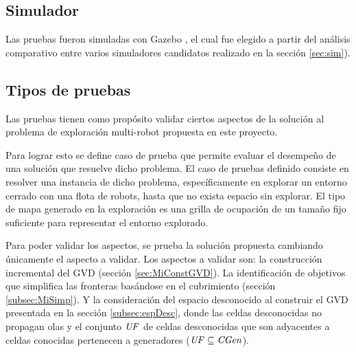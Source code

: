 

\subsection{Simulador}
Las pruebas fueron simuladas con Gazebo \cite{gazebo}, el cual fue elegido a
partir del análisis comparativo entre varios simuladores candidatos realizado
en la sección \ref{sec:sim}). 

\subsection{Tipos de pruebas}
Las pruebas tienen como propósito validar ciertos aspectos de la
solución al problema de exploración multi-robot propuesta en este proyecto.
 
Para lograr esto se define caso de prueba que permite evaluar el desempeño de
una solución que resuelve dicho problema. El caso de pruebas definido consiste
en resolver una instancia de dicho problema, específicamente en explorar un
entorno cerrado con una flota de robots, hasta que no exista espacio sin
explorar. El tipo de mapa generado en la exploración es una grilla de ocupación
de un tamaño fijo suficiente para representar el entorno explorado.

Para poder validar los aspectos, se prueba la solución propuesta cambiando
únicamente el aspecto a validar. Los aspectos a validar son: la construcción
incremental del GVD (sección \ref{sec:MiConstGVD}). La identificación de
objetivos que simplifica las fronteras basándose en el cubrimiento (sección
\ref{subsec:MiSimp}). Y la consideración del espacio desconocido al construir
el GVD presentada en la sección \ref{subsec:espDesc}, donde las celdas
desconocidas no propagan olas y el conjunto $\mathit{UF}$ de celdas desconocidas
que son adyacentes a celdas conocidas pertenecen a generadores ($\mathit{UF}
\subseteq \mathit{CGen}$).

